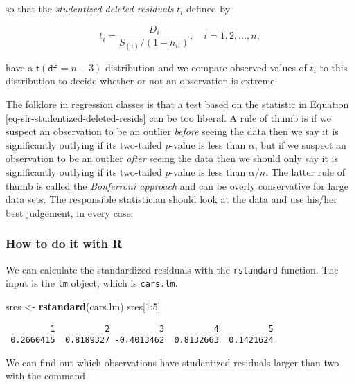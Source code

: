 \documentclass[]{book}
\newenvironment{Shaded}{\begin{snugshade}}{\end{snugshade}}
\newcommand{\KeywordTok}[1]{\textcolor[rgb]{0.13,0.29,0.53}{\textbf{{#1}}}}
\newcommand{\DecValTok}[1]{\textcolor[rgb]{0.00,0.00,0.81}{{#1}}}
\newcommand{\StringTok}[1]{\textcolor[rgb]{0.31,0.60,0.02}{{#1}}}
\newcommand{\NormalTok}[1]{{#1}}
\numberwithin{equation}{chapter}
\numberwithin{figure}{chapter}
\theoremstyle{plain}
\theoremstyle{definition}
\theoremstyle{remark}
\theoremstyle{definition}
\theoremstyle{definition}
\theoremstyle{remark}
\begin{document}
so that the \emph{studentized deleted residuals} \(t_{i}\) defined by

\begin{equation}
\label{eq-slr-studentized-deleted-resids}
t_{i}=\frac{D_{i}}{S_{(i)}/(1-h_{ii})},\quad i=1,2,\ldots,n,
\end{equation}

have a \(\mathsf{t}(\mathtt{df}=n-3)\) distribution and we compare
observed values of \(t_{i}\) to this distribution to decide whether or
not an observation is extreme.

The folklore in regression classes is that a test based on the statistic
in Equation \eqref{eq-slr-studentized-deleted-resids} can be too
liberal. A rule of thumb is if we suspect an observation to be an
outlier \emph{before} seeing the data then we say it is significantly
outlying if its two-tailed \(p\)-value is less than \(\alpha\), but if
we suspect an observation to be an outlier \emph{after} seeing the data
then we should only say it is significantly outlying if its two-tailed
\(p\)-value is less than \(\alpha/n\). The latter rule of thumb is
called the \emph{Bonferroni approach} and can be overly conservative for
large data sets. The responsible statistician should look at the data
and use his/her best judgement, in every case.

\subsubsection{How to do it with R}\label{how-to-do-it-with-r-47}

We can calculate the standardized residuals with the \texttt{rstandard}
function. The input is the \texttt{lm} object, which is
\texttt{cars.lm}.

\begin{Shaded}
\begin{Highlighting}[]
\NormalTok{sres <-}\StringTok{ }\KeywordTok{rstandard}\NormalTok{(cars.lm)}
\NormalTok{sres[}\DecValTok{1}\NormalTok{:}\DecValTok{5}\NormalTok{]}
\end{Highlighting}
\end{Shaded}

\begin{verbatim}
         1          2          3          4          5 
 0.2660415  0.8189327 -0.4013462  0.8132663  0.1421624 
\end{verbatim}

We can find out which observations have studentized residuals larger
than two with the command
\end{document}
